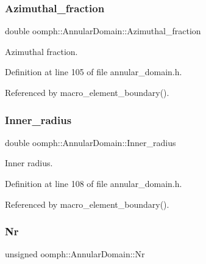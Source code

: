 \subsubsection{\texorpdfstring{Azimuthal\+\_\+fraction}{Azimuthal\_fraction}}
{\footnotesize\ttfamily double oomph\+::\+Annular\+Domain\+::\+Azimuthal\+\_\+fraction\hspace{0.3cm}{\ttfamily [private]}}



Azimuthal fraction. 



Definition at line 105 of file annular\+\_\+domain.\+h.



Referenced by macro\+\_\+element\+\_\+boundary().

\mbox{\label{classoomph_1_1AnnularDomain_a41bead396f1b49783caf334e56a6eb23}} 
\subsubsection{\texorpdfstring{Inner\+\_\+radius}{Inner\_radius}}
{\footnotesize\ttfamily double oomph\+::\+Annular\+Domain\+::\+Inner\+\_\+radius\hspace{0.3cm}{\ttfamily [private]}}



Inner radius. 



Definition at line 108 of file annular\+\_\+domain.\+h.



Referenced by macro\+\_\+element\+\_\+boundary().

\mbox{\label{classoomph_1_1AnnularDomain_a0cbd02650762aa5b6baf32936e553b64}} 
\subsubsection{\texorpdfstring{Nr}{Nr}}
{\footnotesize\ttfamily unsigned oomph\+::\+Annular\+Domain\+::\+Nr\hspace{0.3cm}{\ttfamily [private]}}



